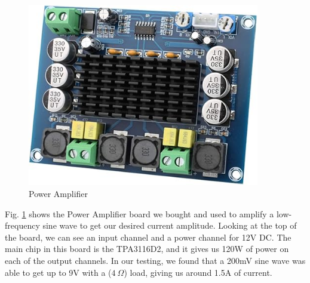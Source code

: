 \begin{figure}[H]
    \centering
    \includegraphics[height=8cm]{power_amp.jpg}
    \caption{Power Amplifier}
    \label{fig:Power Amp}
\end{figure}
Fig. \ref{fig:Power Amp} shows the Power Amplifier board we bought and used to amplify a low-frequency sine wave to get our desired current amplitude. Looking at the top of the board, we can see an input channel and a power channel for 12V DC. The main chip in this board is the TPA3116D2, and it gives us 120W of power on each of the output channels. In our testing, we found that a 200mV sine wave was able to get up to 9V with a ($4~\Omega$) load, giving us around 1.5A of current.